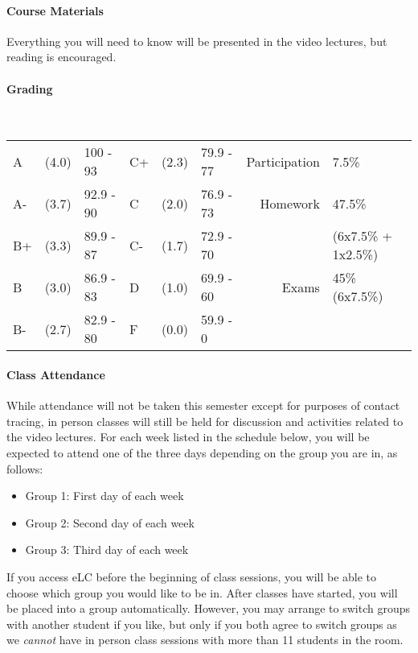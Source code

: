 \documentclass{article}
\begin{document}
  \paragraph{Course Materials}
    Everything you will need to know will be presented in the video lectures, but reading is encouraged.

  \paragraph{Grading} \mbox{}\\
    {\small
      \begin{tabular}{@{} l @{} l l l @{} l l | r l @{}}
        A   & (4.0) & 100 - 93  & C+  & (2.3) & 79.9 - 77 & Participation & 7.5\%\\
        A-  & (3.7) & 92.9 - 90 & C   & (2.0) & 76.9 - 73 & Homework      & 47.5\%\\
        B+  & (3.3) & 89.9 - 87 & C-  & (1.7) & 72.9 - 70 &               & (6x7.5\% + 1x2.5\%)\\
        B   & (3.0) & 86.9 - 83 & D   & (1.0) & 69.9 - 60 & Exams         & 45\% (6x7.5\%)\\
        B-  & (2.7) & 82.9 - 80 & F   & (0.0) & 59.9 - 0  &               &
      \end{tabular}
    }

  \paragraph{Class Attendance}
    While attendance will not be taken this semester except for purposes of contact tracing, in person classes will still be held for discussion and activities related to the video lectures.
    For each week listed in the schedule below, you will be expected to attend one of the three days depending on the group you are in, as follows:
    \begin{itemize}
      \item Group 1: First day of each week
      \item Group 2: Second day of each week
      \item Group 3: Third day of each week
    \end{itemize}
    If you access eLC before the beginning of class sessions, you will be able to choose which group you would like to be in.
    After classes have started, you will be placed into a group automatically.
    However, you may arrange to switch groups with another student if you like, but only if you both agree to switch groups as we \emph{cannot} have in person class sessions with more than 11 students in the room.
\end{document}
